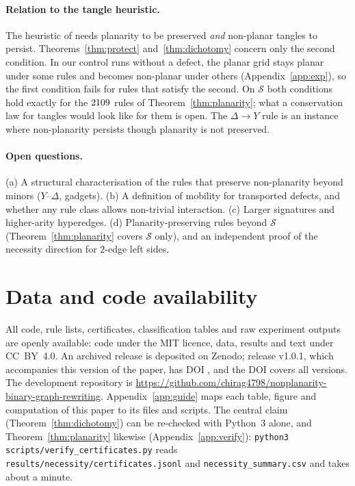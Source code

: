 \documentclass[10pt]{article}
\theoremstyle{definition}
\theoremstyle{plain}
\theoremstyle{remark}
\begin{document}
\paragraph{Relation to the tangle heuristic.} The heuristic of \citet[\S2.4]{gorard2020relativistic} needs planarity to be preserved \emph{and} non-planar tangles to persist. Theorems~\ref{thm:protect} and~\ref{thm:dichotomy} concern only the second condition. In our control runs without a defect, the planar grid stays planar under some rules and becomes non-planar under others (Appendix~\ref{app:exp}), so the first condition fails for rules that satisfy the second. On $\mathcal S$ both conditions hold exactly for the $2109$ rules of Theorem~\ref{thm:planarity}; what a conservation law for tangles would look like for them is open. The $\Delta\to Y$ rule is an instance where non-planarity persists though planarity is not preserved.
\paragraph{Open questions.} (a) A structural characterisation of the rules that preserve non-planarity beyond minors ($Y$--$\Delta$, gadgets). (b) A definition of mobility for transported defects, and whether any rule class allows non-trivial interaction. (c) Larger signatures and higher-arity hyperedges. (d) Planarity-preserving rules beyond $\mathcal S$ (Theorem~\ref{thm:planarity} covers $\mathcal S$ only), and an independent proof of the necessity direction for $2$-edge left sides.

\section*{Data and code availability}
All code, rule lists, certificates, classification tables and raw experiment outputs are openly available: code under the MIT licence, data, results and text under CC~BY~4.0. \ifdefined\zenododoi An archived release is deposited on Zenodo; release v1.0.1, which accompanies this version of the paper, has DOI \href{https://doi.org/\zenododoi}{\texttt{\zenododoi}}, and the DOI \href{https://doi.org/\zenodoconcept}{\texttt{\zenodoconcept}} covers all versions. \fi The development repository is \url{https://github.com/chirag4798/nonplanarity-binary-graph-rewriting}. Appendix~\ref{app:guide} maps each table, figure and computation of this paper to its files and scripts. The central claim (Theorem~\ref{thm:dichotomy}) can be re-checked with Python~3 alone, and Theorem~\ref{thm:planarity} likewise (Appendix~\ref{app:verify}): \texttt{python3 scripts/verify\_certificates.py} reads \texttt{results/necessity/certificates.jsonl} and \texttt{necessity\_summary.csv} and takes about a minute.
\end{document}
